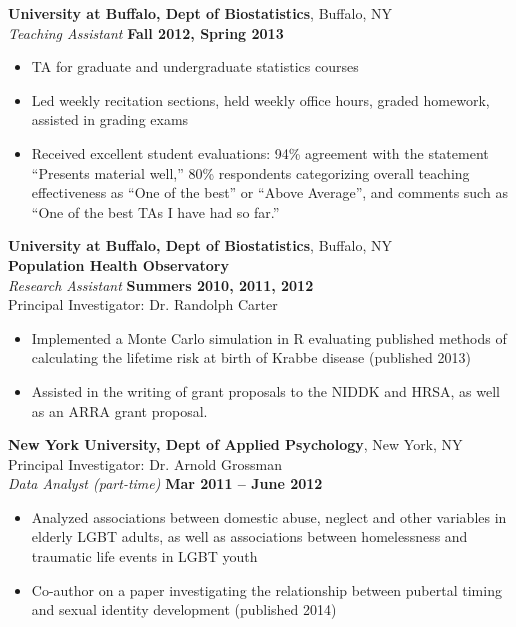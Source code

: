 \documentclass{article}
\begin{document}
 {\bf University at Buffalo, Dept of Biostatistics}, Buffalo, NY\\
 {\it Teaching Assistant} \hfill {\bf Fall 2012, Spring 2013}
 \begin{itemize} \itemsep -2pt
  \item TA for graduate and undergraduate statistics courses
  \item Led weekly recitation sections, held weekly office hours, graded homework, assisted in grading exams
  \item Received excellent student evaluations: 94\% agreement with the statement ``Presents material well,'' 80\% respondents categorizing overall teaching effectiveness as ``One of the best'' or ``Above Average'', and comments such as ``One of the best TAs I have had so far.''
 \end{itemize}
 
 {\bf University at Buffalo, Dept of Biostatistics}, Buffalo, NY\\
 {\bf Population Health Observatory}\\
 {\it Research Assistant} \hfill {\bf Summers 2010, 2011, 2012} \\
 Principal Investigator: Dr. Randolph Carter
 \begin{itemize} \itemsep -2pt
  \item Implemented a Monte Carlo simulation in R evaluating published 
        methods of calculating the lifetime risk at birth of Krabbe disease
        (published 2013)
  \item Assisted in the writing of grant proposals to the NIDDK and HRSA,
        as well as an ARRA grant proposal.
 \end{itemize}

 {\bf New York University, Dept of Applied Psychology}, New York, NY\\
 Principal Investigator: Dr. Arnold Grossman\\
 {\it Data Analyst (part-time)} \hfill {\bf Mar 2011 -- June 2012}
 \begin{itemize} \itemsep -2pt
  \item Analyzed associations between domestic abuse, neglect and
        other variables in elderly LGBT adults, as well as associations
        between homelessness and traumatic life events in LGBT youth
  \item Co-author on a paper investigating the relationship between
        pubertal timing and sexual identity development (published 2014)
 \end{itemize}
\end{document}
